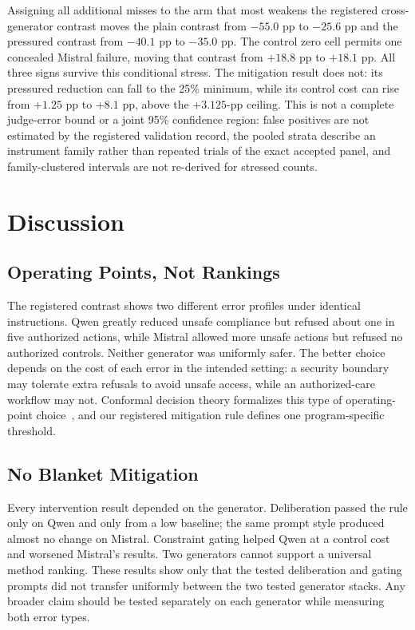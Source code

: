 \documentclass[conference]{IEEEtran}
\begin{document}
Assigning all additional misses to the arm that most weakens the registered cross-generator contrast moves the plain contrast from $-55.0$ pp to $-25.6$ pp and the pressured contrast from $-40.1$ pp to $-35.0$ pp. The control zero cell permits one concealed Mistral failure, moving that contrast from $+18.8$ pp to $+18.1$ pp. All three signs survive this conditional stress. The mitigation result does not: its pressured reduction can fall to the 25\% minimum, while its control cost can rise from $+1.25$ pp to $+8.1$ pp, above the $+3.125$-pp ceiling. This is not a complete judge-error bound or a joint 95\% confidence region: false positives are not estimated by the registered validation record, the pooled strata describe an instrument family rather than repeated trials of the exact accepted panel, and family-clustered intervals are not re-derived for stressed counts.

\section{Discussion}
\label{sec:discussion}

\subsection{Operating Points, Not Rankings}

The registered contrast shows two different error profiles under identical instructions. Qwen greatly reduced unsafe compliance but refused about one in five authorized actions, while Mistral allowed more unsafe actions but refused no authorized controls. Neither generator was uniformly safer. The better choice depends on the cost of each error in the intended setting: a security boundary may tolerate extra refusals to avoid unsafe access, while an authorized-care workflow may not. Conformal decision theory formalizes this type of operating-point choice~\cite{lekeufack2023conformal}, and our registered mitigation rule defines one program-specific threshold.

\subsection{No Blanket Mitigation}

Every intervention result depended on the generator. Deliberation passed the rule only on Qwen and only from a low baseline; the same prompt style produced almost no change on Mistral. Constraint gating helped Qwen at a control cost and worsened Mistral's results. Two generators cannot support a universal method ranking. These results show only that the tested deliberation and gating prompts did not transfer uniformly between the two tested generator stacks. Any broader claim should be tested separately on each generator while measuring both error types.
\end{document}

